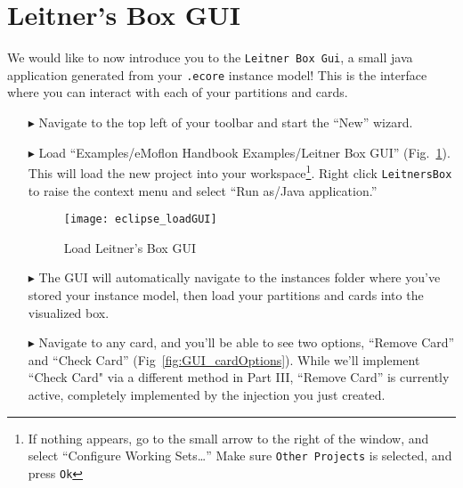 \newpage
\section{Leitner's Box GUI}
\genHeader
\hypertarget{sec:LBGUI}{}

We would like to now introduce you to the \texttt{Leitner Box Gui}, a small java application generated from your \texttt{.ecore} instance model! This is the
interface where you can interact with each of your partitions and cards.

\begin{itemize}

\item[$\blacktriangleright$] Navigate to the top left of your toolbar and start the ``New'' wizard.

\item[$\blacktriangleright$] Load ``Examples/eMoflon Handbook Examples/Leitner Box GUI'' (Fig.~\ref{fig:GUI_load}). This will load the new project into
your workspace\footnote{If nothing appears, go to the small arrow to the right of the window, and select ``Configure Working Sets\ldots'' Make sure \texttt{Other
Projects} is selected, and press \texttt{Ok}}. Right click \texttt{LeitnersBox} to raise the context menu and select ``Run as/Java application.''

\begin{figure}[htbp]
    \centering
    \texttt{[image: eclipse\_loadGUI]}
    \caption{Load Leitner's Box GUI}
    \label{fig:GUI_load}
\end{figure}

\clearpage

\item[$\blacktriangleright$] The GUI will automatically navigate to the instances folder where you've stored your instance model, then load your partitions and
cards into the visualized box.

\vspace{1cm}

\item[$\blacktriangleright$] Navigate to any card, and you'll be able to see two options, ``Remove Card'' and ``Check Card'' (Fig~\ref{fig:GUI_cardOptions}).
While we'll implement ``Check Card" via a different method in Part III, ``Remove Card'' is currently active, completely implemented by the injection you just created.

\vspace{1cm}


\end{itemize}

